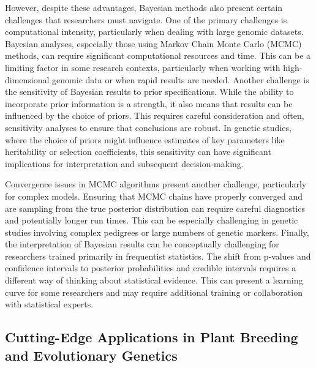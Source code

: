 \documentclass[12pt,a4paper]{article}
\begin{document}
However, despite these advantages, Bayesian methods also present certain challenges that researchers must navigate. One of the primary challenges is computational intensity, particularly when dealing with large genomic datasets. Bayesian analyses, especially those using Markov Chain Monte Carlo (MCMC) methods, can require significant computational resources and time. This can be a limiting factor in some research contexts, particularly when working with high-dimensional genomic data or when rapid results are needed. Another challenge is the sensitivity of Bayesian results to prior specifications. While the ability to incorporate prior information is a strength, it also means that results can be influenced by the choice of priors. This requires careful consideration and often, sensitivity analyses to ensure that conclusions are robust. In genetic studies, where the choice of priors might influence estimates of key parameters like heritability or selection coefficients, this sensitivity can have significant implications for interpretation and subsequent decision-making.

Convergence issues in MCMC algorithms present another challenge, particularly for complex models. Ensuring that MCMC chains have properly converged and are sampling from the true posterior distribution can require careful diagnostics and potentially longer run times. This can be especially challenging in genetic studies involving complex pedigrees or large numbers of genetic markers. Finally, the interpretation of Bayesian results can be conceptually challenging for researchers trained primarily in frequentist statistics. The shift from p-values and confidence intervals to posterior probabilities and credible intervals requires a different way of thinking about statistical evidence. This can present a learning curve for some researchers and may require additional training or collaboration with statistical experts.

\subsection{Cutting-Edge Applications in Plant Breeding and Evolutionary Genetics}
\end{document}
